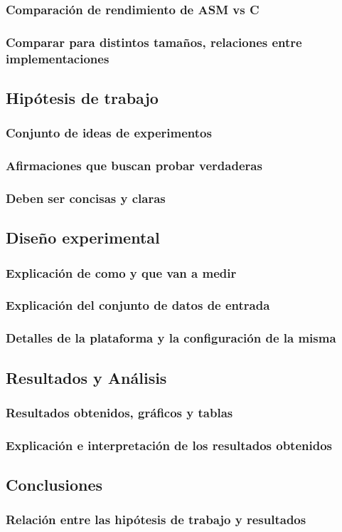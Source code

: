 \subsubsection*{Comparación de rendimiento de ASM vs C}
\subsubsection*{Comparar para distintos tamaños, relaciones entre implementaciones}

\subsection{Hipótesis de trabajo}
\subsubsection*{Conjunto de ideas de experimentos}
\subsubsection*{Afirmaciones que buscan probar verdaderas}
\subsubsection*{Deben ser concisas y claras}

\subsection{Diseño experimental}
\subsubsection*{Explicación de como y que van a medir}
\subsubsection*{Explicación del conjunto de datos de entrada}
\subsubsection*{Detalles de la plataforma y la configuración de la misma}

\subsection{Resultados y Análisis}
\subsubsection*{Resultados obtenidos, gráficos y tablas}
\subsubsection*{Explicación e interpretación de los resultados obtenidos}

\subsection{Conclusiones}
\subsubsection*{Relación entre las hipótesis de trabajo y resultados}